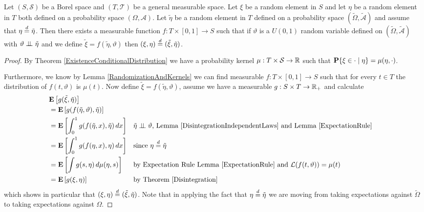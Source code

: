 \begin{lem}\label{Transfer}Let $(S, \mathcal{S})$ be a Borel space and $(T, \mathcal{T})$ be 
  a general measurable space.  Let $\xi$ be a random element in $S$
  and let $\eta$ be a random element in $T$ both defined on a 
  probability space $(\Omega, \mathcal{A})$.  Let $\tilde{\eta}$ be a
  random element in $T$ defined on a probability space
  $(\tilde{\Omega}, \tilde{\mathcal{A}})$ and assume that
  $\eta \overset{d}= \tilde{\eta}$.  Then there
  exists a measurable function $f : T \times [0,1] \to S$ such that if
  $\vartheta$ is a $U(0,1)$ random variable defined on
  $(\tilde{\Omega}, \tilde{\mathcal{A}})$ with
  $\vartheta \perp \! \! \! \perp_{} \tilde{\eta}$ and we define
  $\tilde{\xi} = f(\tilde{\eta}, \vartheta)$ then $(\xi, \eta) \overset{d}=
  (\tilde{\xi}, \tilde{\eta})$.
\end{lem}
\begin{proof}
By Theorem \ref{ExistenceConditionalDistribution} we have a probability kernel
$\mu : T \times \mathcal{S} \to \mathbb{R}$ such that
$\textbf{P}\{\xi \in \cdot \mid \eta\} = \mu(\eta, \cdot)$.  

Furthermore, we know by Lemma \ref{RandomizationAndKernels} we can find measurable $f : T
\times [0,1] \to S$ such that for every $t \in T$ the distribution of $f(t, \vartheta)$ is
$\mu(t)$.  Now define $\tilde{\xi} = f(\tilde{\eta}, \vartheta)$,
assume we have a measurable $g : S \times T \to \mathbb{R}_+$ and
calculate
\begin{align*}
&\textbf{E}\left[g(\tilde{\xi}, \tilde{\eta})\right] \\
&=\textbf{E}\left[g(f(\tilde{\eta}, \vartheta), \tilde{\eta})\right] \\
&= \textbf{E}\left[\int_0^1 g(f(\tilde{\eta},x), \tilde{\eta}) \, dx\right] & &
\text{$\tilde{\eta} \perp \! \! \! \perp \vartheta$, Lemma
  \ref{DisintegrationIndependentLaws} and Lemma \ref{ExpectationRule}}\\
&= \textbf{E}\left[\int_0^1 g(f(\eta,x), \eta) \, dx\right] & &
\text{since $\eta \overset{d}= \tilde{\eta}$}\\
&= \textbf{E}\left[\int g(s, \eta) \, d\mu(\eta,s)\right] & & \text{by
  Expectation Rule
  Lemma \ref{ExpectationRule} and $\mathcal{L}(f(t,\vartheta)) = \mu(t)$} \\
&= \textbf{E}\left[g(\xi, \eta)\right] & & \text{by Theorem \ref{Disintegration}}
\end{align*}
which shows in particular that $(\xi, \eta) \overset{d}= (\tilde{\xi},
\tilde{\eta})$.  Note that in applying the fact that $\eta \overset{d}=
\tilde{\eta}$ we are moving from taking expectations against
$\tilde{\Omega}$ to taking expectations against $\Omega$.
\end{proof}

